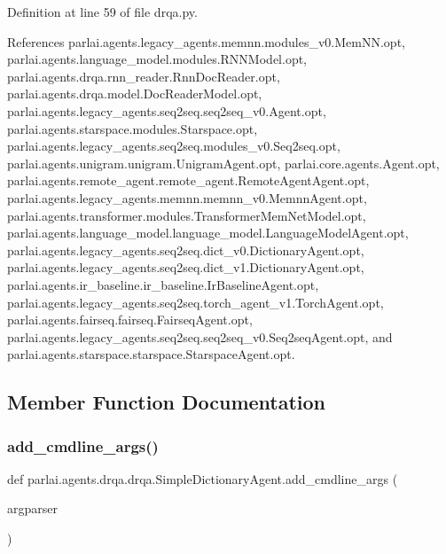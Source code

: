 Definition at line 59 of file drqa.\+py.



References parlai.\+agents.\+legacy\+\_\+agents.\+memnn.\+modules\+\_\+v0.\+Mem\+N\+N.\+opt, parlai.\+agents.\+language\+\_\+model.\+modules.\+R\+N\+N\+Model.\+opt, parlai.\+agents.\+drqa.\+rnn\+\_\+reader.\+Rnn\+Doc\+Reader.\+opt, parlai.\+agents.\+drqa.\+model.\+Doc\+Reader\+Model.\+opt, parlai.\+agents.\+legacy\+\_\+agents.\+seq2seq.\+seq2seq\+\_\+v0.\+Agent.\+opt, parlai.\+agents.\+starspace.\+modules.\+Starspace.\+opt, parlai.\+agents.\+legacy\+\_\+agents.\+seq2seq.\+modules\+\_\+v0.\+Seq2seq.\+opt, parlai.\+agents.\+unigram.\+unigram.\+Unigram\+Agent.\+opt, parlai.\+core.\+agents.\+Agent.\+opt, parlai.\+agents.\+remote\+\_\+agent.\+remote\+\_\+agent.\+Remote\+Agent\+Agent.\+opt, parlai.\+agents.\+legacy\+\_\+agents.\+memnn.\+memnn\+\_\+v0.\+Memnn\+Agent.\+opt, parlai.\+agents.\+transformer.\+modules.\+Transformer\+Mem\+Net\+Model.\+opt, parlai.\+agents.\+language\+\_\+model.\+language\+\_\+model.\+Language\+Model\+Agent.\+opt, parlai.\+agents.\+legacy\+\_\+agents.\+seq2seq.\+dict\+\_\+v0.\+Dictionary\+Agent.\+opt, parlai.\+agents.\+legacy\+\_\+agents.\+seq2seq.\+dict\+\_\+v1.\+Dictionary\+Agent.\+opt, parlai.\+agents.\+ir\+\_\+baseline.\+ir\+\_\+baseline.\+Ir\+Baseline\+Agent.\+opt, parlai.\+agents.\+legacy\+\_\+agents.\+seq2seq.\+torch\+\_\+agent\+\_\+v1.\+Torch\+Agent.\+opt, parlai.\+agents.\+fairseq.\+fairseq.\+Fairseq\+Agent.\+opt, parlai.\+agents.\+legacy\+\_\+agents.\+seq2seq.\+seq2seq\+\_\+v0.\+Seq2seq\+Agent.\+opt, and parlai.\+agents.\+starspace.\+starspace.\+Starspace\+Agent.\+opt.



\subsection{Member Function Documentation}
\mbox{\label{classparlai_1_1agents_1_1drqa_1_1drqa_1_1SimpleDictionaryAgent_a43e40daa2e8260d919347a8e40ae3ced}} 
\subsubsection{\texorpdfstring{add\+\_\+cmdline\+\_\+args()}{add\_cmdline\_args()}}
{\footnotesize\ttfamily def parlai.\+agents.\+drqa.\+drqa.\+Simple\+Dictionary\+Agent.\+add\+\_\+cmdline\+\_\+args (\begin{DoxyParamCaption}\item[{}]{argparser }\end{DoxyParamCaption})\hspace{0.3cm}{\ttfamily [static]}}




